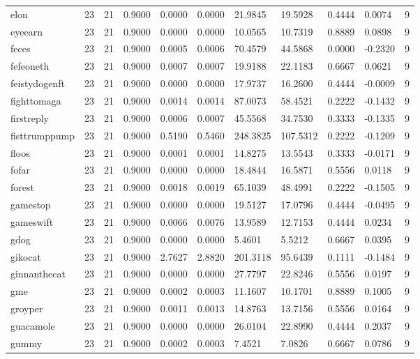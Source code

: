 \begin{table}[htbp]
\begin{tabular}{lllllllllll}
elon & 23 & 21 & 0.9000 & 0.0000 & 0.0000 & 21.9845 & 19.5928 & 0.4444 & 0.0074 & 9 \\
eyeearn & 23 & 21 & 0.9000 & 0.0000 & 0.0000 & 10.0565 & 10.7319 & 0.8889 & 0.0898 & 9 \\
feces & 23 & 21 & 0.9000 & 0.0005 & 0.0006 & 70.4579 & 44.5868 & 0.0000 & -0.2320 & 9 \\
fefeoneth & 23 & 21 & 0.9000 & 0.0007 & 0.0007 & 19.9188 & 22.1183 & 0.6667 & 0.0621 & 9 \\
feistydogenft & 23 & 21 & 0.9000 & 0.0000 & 0.0000 & 17.9737 & 16.2600 & 0.4444 & -0.0009 & 9 \\
fighttomaga & 23 & 21 & 0.9000 & 0.0014 & 0.0014 & 87.0073 & 58.4521 & 0.2222 & -0.1432 & 9 \\
firstreply & 23 & 21 & 0.9000 & 0.0006 & 0.0007 & 45.5568 & 34.7530 & 0.3333 & -0.1335 & 9 \\
fisttrumppump & 23 & 21 & 0.9000 & 0.5190 & 0.5460 & 248.3825 & 107.5312 & 0.2222 & -0.1209 & 9 \\
floos & 23 & 21 & 0.9000 & 0.0001 & 0.0001 & 14.8275 & 13.5543 & 0.3333 & -0.0171 & 9 \\
fofar & 23 & 21 & 0.9000 & 0.0000 & 0.0000 & 18.4844 & 16.5871 & 0.5556 & 0.0118 & 9 \\
forest & 23 & 21 & 0.9000 & 0.0018 & 0.0019 & 65.1039 & 48.4991 & 0.2222 & -0.1505 & 9 \\
gamestop & 23 & 21 & 0.9000 & 0.0000 & 0.0000 & 19.5127 & 17.0796 & 0.4444 & -0.0495 & 9 \\
gameswift & 23 & 21 & 0.9000 & 0.0066 & 0.0076 & 13.9589 & 12.7153 & 0.4444 & 0.0234 & 9 \\
gdog & 23 & 21 & 0.9000 & 0.0000 & 0.0000 & 5.4601 & 5.5212 & 0.6667 & 0.0395 & 9 \\
gikocat & 23 & 21 & 0.9000 & 2.7627 & 2.8820 & 201.3118 & 95.6439 & 0.1111 & -0.1484 & 9 \\
ginnanthecat & 23 & 21 & 0.9000 & 0.0000 & 0.0000 & 27.7797 & 22.8246 & 0.5556 & 0.0197 & 9 \\
gme & 23 & 21 & 0.9000 & 0.0002 & 0.0003 & 11.1607 & 10.1701 & 0.8889 & 0.1005 & 9 \\
groyper & 23 & 21 & 0.9000 & 0.0011 & 0.0013 & 14.8763 & 13.7156 & 0.5556 & 0.0164 & 9 \\
guacamole & 23 & 21 & 0.9000 & 0.0000 & 0.0000 & 26.0104 & 22.8990 & 0.4444 & 0.2037 & 9 \\
gummy & 23 & 21 & 0.9000 & 0.0002 & 0.0003 & 7.4521 & 7.0826 & 0.6667 & 0.0786 & 9 \\

\end{tabular}
\end{table}
